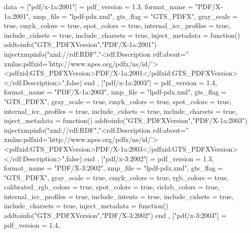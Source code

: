 data = {
        ["pdf/x-1a:2001"] =
        {
            pdf_version             = 1.3,
            format_name             = "PDF/X-1a:2001",
            xmp_file                = "lpdf-pdx.xml",
            gts_flag                = "GTS_PDFX",
            gray_scale              = true,
            cmyk_colors             = true,
            spot_colors             = true,
            internal_icc_profiles   = true,
            include_cidsets         = true,
            include_charsets        = true,
            inject_metadata         = function()
                addtoinfo("GTS_PDFXVersion","PDF/X-1a:2001")
                injectxmpinfo("xml://rdf:RDF","<rdf:Description rdf:about='' xmlns:pdfxid='http://www.npes.org/pdfx/ns/id/'><pdfxid:GTS_PDFXVersion>PDF/X-1a:2001</pdfxid:GTS_PDFXVersion></rdf:Description>",false)
            end
        },
        ["pdf/x-1a:2003"] =
        {
            pdf_version             = 1.4,
            format_name             = "PDF/X-1a:2003",
            xmp_file                = "lpdf-pdx.xml",
            gts_flag                = "GTS_PDFX",
            gray_scale              = true,
            cmyk_colors             = true,
            spot_colors             = true,
            internal_icc_profiles   = true,
            include_cidsets         = true,
            include_charsets        = true,
            inject_metadata         = function()
                addtoinfo("GTS_PDFXVersion","PDF/X-1a:2003")
                injectxmpinfo("xml://rdf:RDF","<rdf:Description rdf:about='' xmlns:pdfxid='http://www.npes.org/pdfx/ns/id/'><pdfxid:GTS_PDFXVersion>PDF/X-1a:2003</pdfxid:GTS_PDFXVersion></rdf:Description>",false)
            end
        },
        ["pdf/x-3:2002"] = {
            pdf_version             = 1.3,
            format_name             = "PDF/X-3:2002",
            xmp_file                = "lpdf-pdx.xml",
            gts_flag                = "GTS_PDFX",
            gray_scale              = true,
            cmyk_colors             = true,
            rgb_colors              = true,
            calibrated_rgb_colors   = true,
            spot_colors             = true,
            cielab_colors           = true,
            internal_icc_profiles   = true,
            include_intents         = true,
            include_cidsets         = true,
            include_charsets        = true,
            inject_metadata         = function()
                addtoinfo("GTS_PDFXVersion","PDF/X-3:2002")
            end
        },
        ["pdf/x-3:2003"] = {
            pdf_version             = 1.4,
}}
